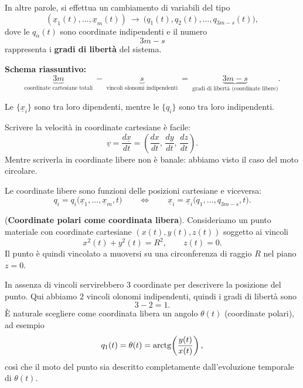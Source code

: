 In altre parole, si effettua un cambiamento di variabili del tipo
\[
(\underline{x}_1(t),\dots,\underline{x}_m(t))
\ \longrightarrow\
\bigl(q_1(t),q_2(t),\dots,q_{3m-s}(t)\bigr),
\]
dove le $q_\alpha(t)$ sono coordinate indipendenti e il numero
\[
3m-s
\]
rappresenta i \textbf{gradi di libertà} del sistema.

\textbf{Schema riassuntivo:}
\[
\underbrace{3m}_{\text{coordinate cartesiane totali}}
\ -\
\underbrace{s}_{\text{vincoli olonomi indipendenti}}
\ =\
\underbrace{3m-s}_{\text{gradi di libertà (coordinate libere)}}.
\]
\begin{oss}{}
Le $\{\underline{x}_i\}$ sono tra loro dipendenti, mentre le $\{q_i\}$ sono tra loro indipendenti.
\end{oss}

\begin{oss}{}
Scrivere la velocità in coordinate cartesiane è facile:
\[
\underline{v}=\frac{d\underline{x}}{dt}
=\left(\frac{dx}{dt},\,\frac{dy}{dt},\,\frac{dz}{dt}\right).
\]
Mentre scriverla in coordinate libere non è banale: abbiamo visto il caso del moto circolare.
\end{oss}

\begin{oss}{}
Le coordinate libere sono funzioni delle posizioni cartesiane e viceversa:
\[
q_i=q_i\bigl(\underline{x}_1,\dots,\underline{x}_m,t\bigr)
\qquad \Longleftrightarrow \qquad
\underline{x}_i=\underline{x}_i\bigl(q_1,\dots,q_{3m-s},t\bigr).
\]
\end{oss}

\begin{example}{}
(\textbf{Coordinate polari come coordinata libera}).
Consideriamo un punto materiale con coordinate cartesiane $(x(t),y(t),z(t))$ soggetto ai vincoli
\[
x^2(t)+y^2(t)=R^2,
\qquad
z(t)=0.
\]
Il punto è quindi vincolato a muoversi su una circonferenza di raggio $R$ nel piano $z=0$.

In assenza di vincoli servirebbero $3$ coordinate per descrivere la posizione del punto. Qui abbiamo $2$ vincoli olonomi indipendenti, quindi i gradi di libertà sono
\[
3-2=1.
\]
È naturale scegliere come coordinata libera un angolo $\theta(t)$ (coordinate polari), ad esempio
\[
q_1(t)=\theta(t)=\operatorname{arctg}\!\left(\frac{y(t)}{x(t)}\right),
\]
così che il moto del punto sia descritto completamente dall'evoluzione temporale di $\theta(t)$.
\end{example}

